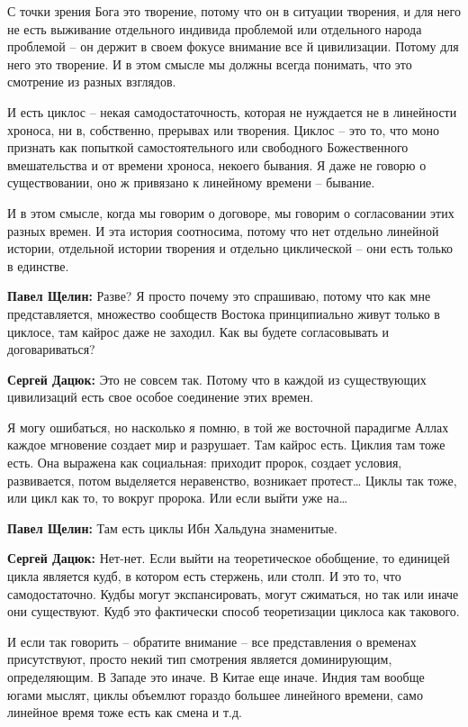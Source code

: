 С точки зрения Бога это творение, потому что он в ситуации творения, и для него
не есть выживание отдельного индивида проблемой или отдельного народа проблемой
– он держит в своем фокусе внимание все й цивилизации. Потому для него это
творение. И в этом смысле мы должны всегда понимать, что это смотрение из
разных взглядов.

И есть циклос – некая самодостаточность, которая не нуждается не в линейности
хроноса, ни в, собственно, прерывах или творения. Циклос – это то, что моно
признать как попыткой самостоятельного или свободного Божественного
вмешательства и от времени хроноса, некоего бывания. Я даже не говорю о
существовании, оно ж привязано к линейному времени – бывание.

И в этом смысле, когда мы говорим о договоре, мы говорим о согласовании этих
разных времен. И эта история соотносима, потому что нет отдельно линейной
истории, отдельной истории творения и отдельно циклической – они есть только в
единстве.

\textbf{Павел Щелин:} Разве? Я просто почему это спрашиваю, потому что как мне
представляется, множество сообществ Востока принципиально живут только в
циклосе, там кайрос даже не заходил. Как вы будете согласовывать и
договариваться?

\textbf{Сергей Дацюк:} Это не совсем так. Потому что в каждой из существующих
цивилизаций есть свое особое соединение этих времен.

Я могу ошибаться, но насколько я помню, в той же восточной парадигме Аллах
каждое мгновение создает мир и разрушает. Там кайрос есть. Циклия там тоже
есть. Она выражена как социальная: приходит пророк, создает условия,
развивается, потом выделяется неравенство, возникает протест… Циклы так тоже,
или цикл как то, то вокруг пророка. Или если выйти уже на…

\textbf{Павел Щелин:} Там есть циклы Ибн Хальдуна знаменитые.

\textbf{Сергей Дацюк:} Нет-нет. Если выйти на теоретическое обобщение, то единицей цикла
является кудб, в котором есть стержень, или столп. И это то, что
самодостаточно. Кудбы могут экспансировать, могут сжиматься, но так или иначе
они существуют. Кудб это фактически способ теоретизации циклоса как такового.

И если так говорить – обратите внимание – все представления о временах
присутствуют, просто некий тип смотрения является доминирующим, определяющим. В
Западе это иначе. В Китае еще иначе. Индия там вообще югами мыслят, циклы
объемлют гораздо большее линейного времени, само линейное время тоже есть как
смена и т.д.

